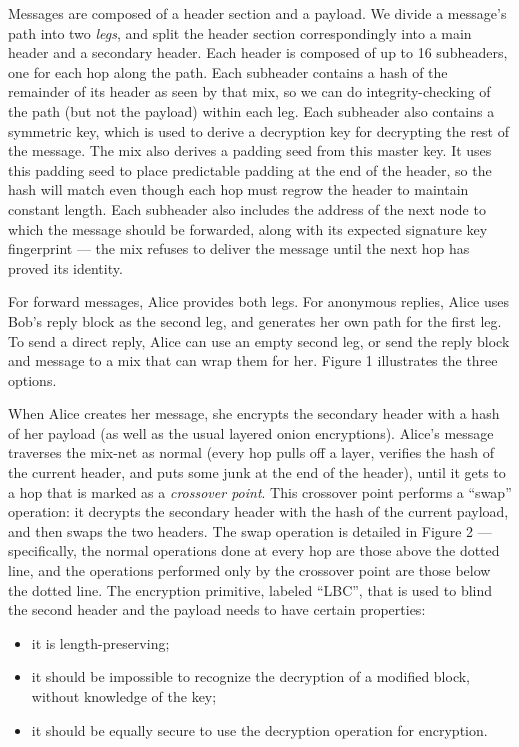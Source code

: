 \documentclass[11pt]{IEEEtran}
\begin{document}
Messages are composed of a header section and a payload. We divide
a message's path into two \emph{legs}, and split the header section
correspondingly into a main header and a secondary header. Each header
is composed of up to 16 subheaders, one for each hop along the path.
Each subheader contains a hash of the remainder of its header as
seen by that mix, so we can do
integrity-checking of the path (but not the payload) within each leg.
Each subheader also contains a symmetric key, which is used to derive a
decryption key for decrypting the rest of the message. The mix also
derives a padding seed from this master key. It uses this padding seed
to place predictable padding at the end of the header, so the hash will
match even though each hop must regrow the header to maintain constant
length. Each subheader also includes the address of the next node to which
the message should be forwarded, along with its expected signature key
fingerprint --- the mix refuses to deliver the message until the next
hop has proved its identity.

For forward messages, Alice provides both legs. For anonymous replies, Alice
uses Bob's reply block as the second leg, and generates her own path
for the first leg.  To send a direct reply, Alice can use an empty
second leg, or send the reply block and message to a mix that can wrap
them for her. Figure 1 illustrates the three options.

When Alice creates her message, she encrypts the secondary header
with a hash of her payload (as well as the usual layered onion
encryptions). Alice's message traverses the mix-net as normal (every
hop pulls off a layer, verifies the hash of the current header,
and puts some junk at the end of the header), until it gets to a
hop that is marked as a \emph{crossover point}. This crossover point
performs a ``swap'' operation: it decrypts the secondary header with
the hash of the current payload, and then swaps the two headers. The
swap operation is detailed in Figure 2 --- specifically, the normal
operations done at every hop are those above the dotted line, and the
operations performed only by the crossover point are those below
the dotted line. The encryption primitive, labeled ``LBC'', that is
used to blind the second header and the payload needs to have certain
properties:

\begin{itemize}
\item it is length-preserving;

\item it should be impossible to recognize the decryption of a modified
      block, without knowledge of the key;
\item it should be equally secure to use the decryption operation
      for encryption.
\end{itemize}
\end{document}
